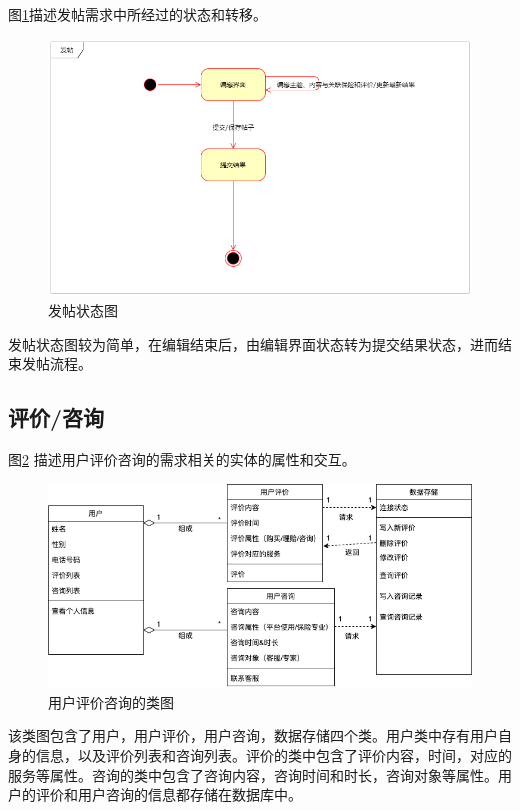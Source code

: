 \documentclass[a4paper]{ctexart}
\begin{document}
图\ref{fig:发帖状态图}描述发帖需求中所经过的状态和转移。
\begin{figure}[H]
\centering
\includegraphics[scale=0.5]{image/2_10状态图.png}
\caption{发帖状态图}
\label{fig:发帖状态图}
\end{figure}
发帖状态图较为简单，在编辑结束后，由编辑界面状态转为提交结果状态，进而结束发帖流程。

\subsection{评价/咨询}

图\ref{fig:用户评价咨询的类图} 描述用户评价咨询的需求相关的实体的属性和交互。
\begin{figure}[H]
\centering
\includegraphics[scale=0.5]{image/3_2类图.png}
\caption{用户评价咨询的类图}
\label{fig:用户评价咨询的类图}
\end{figure}
该类图包含了用户，用户评价，用户咨询，数据存储四个类。用户类中存有用户自身的信息，以及评价列表和咨询列表。评价的类中包含了评价内容，时间，对应的服务等属性。咨询的类中包含了咨询内容，咨询时间和时长，咨询对象等属性。用户的评价和用户咨询的信息都存储在数据库中。\\
\end{document}
